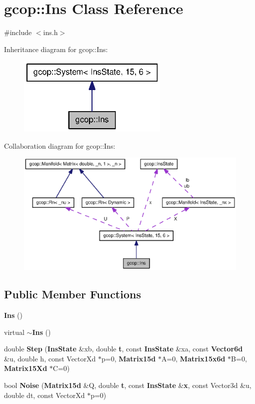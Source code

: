 \section{gcop\-:\-:\-Ins \-Class \-Reference}
\label{classgcop_1_1Ins}


{\ttfamily \#include $<$ins.\-h$>$}



\-Inheritance diagram for gcop\-:\-:\-Ins\-:
\nopagebreak
\begin{figure}[H]
\begin{center}
\leavevmode
\includegraphics[width=204pt]{classgcop_1_1Ins__inherit__graph}
\end{center}
\end{figure}


\-Collaboration diagram for gcop\-:\-:\-Ins\-:
\nopagebreak
\begin{figure}[H]
\begin{center}
\leavevmode
\includegraphics[width=350pt]{classgcop_1_1Ins__coll__graph}
\end{center}
\end{figure}
\subsection*{\-Public \-Member \-Functions}
\begin{DoxyCompactItemize}
\item 
{\bf \-Ins} ()
\item 
virtual {\bf $\sim$\-Ins} ()
\item 
double {\bf \-Step} ({\bf \-Ins\-State} \&xb, double {\bf t}, const {\bf \-Ins\-State} \&xa, const {\bf \-Vector6d} \&u, double h, const \-Vector\-Xd $\ast$p=0, {\bf \-Matrix15d} $\ast$\-A=0, {\bf \-Matrix15x6d} $\ast$\-B=0, {\bf \-Matrix15\-Xd} $\ast$\-C=0)
\item 
bool {\bf \-Noise} ({\bf \-Matrix15d} \&\-Q, double {\bf t}, const {\bf \-Ins\-State} \&{\bf x}, const \-Vector3d \&u, double dt, const \-Vector\-Xd $\ast$p=0)
\end{DoxyCompactItemize}
